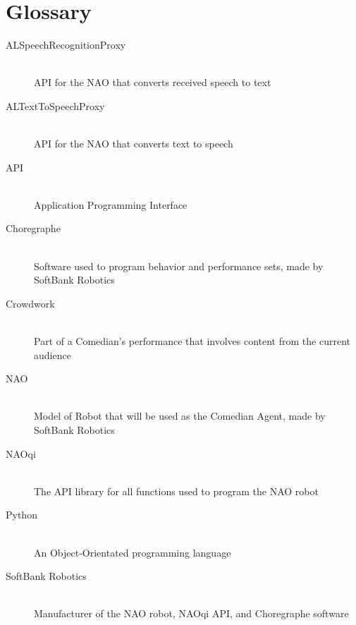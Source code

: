 \documentclass[onecolumn, draftclsnofoot,10pt, compsoc]{IEEEtran}
\begin{document}
\section{Glossary}
\begin{description}
  \item [ALSpeechRecognitionProxy] \hfill \\ API for the NAO that converts received speech to text
  \item [ALTextToSpeechProxy] \hfill \\ API for the NAO that converts text to speech
  \item [API] \hfill \\ Application Programming Interface
  \item [Choregraphe] \hfill \\ Software used to program behavior and performance sets, made by SoftBank Robotics
  \item [Crowdwork] \hfill \\ Part of a Comedian's performance that involves content from the current audience
  \item [NAO] \hfill \\ Model of Robot that will be used as the Comedian Agent, made by SoftBank Robotics
  \item [NAOqi] \hfill \\ The API library for all functions used to program the NAO robot
  \item [Python] \hfill \\ An Object-Orientated programming language
  \item [SoftBank Robotics] \hfill \\ Manufacturer of the NAO robot, NAOqi API, and Choregraphe software

\pagebreak
\end{description}


\end{document}

